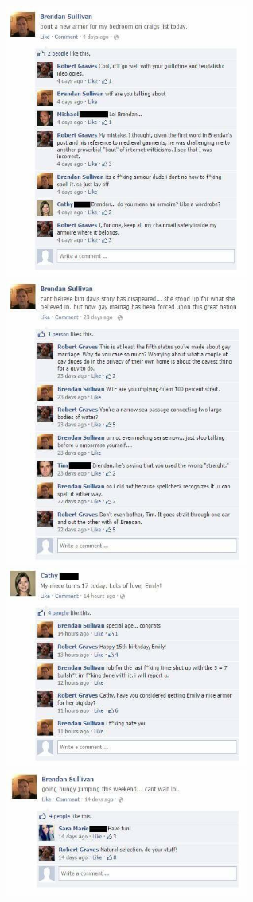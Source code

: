 \documentclass{42-en}
\begin{document}
	\includegraphics[width=8cm]{bren12.jpg}
	\includegraphics[width=8cm]{bren13.jpg}
	\includegraphics[width=8cm]{bren14.jpg}
	\includegraphics[width=8cm]{bren15.jpg}
\end{document}
